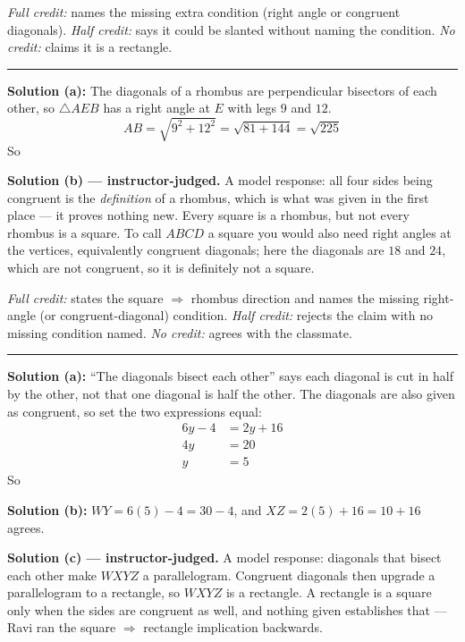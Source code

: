 \documentclass[12pt]{article}
\begin{document}
\emph{Full credit:} names the missing extra condition (right angle or congruent diagonals). \emph{Half credit:} says it could be slanted without naming the condition. \emph{No credit:} claims it is a rectangle.

\vspace{0.2cm}\noindent\rule{\linewidth}{0.2pt}


\textbf{Solution (a):} The diagonals of a rhombus are perpendicular bisectors of each other, so $\triangle AEB$ has a right angle at $E$ with legs $9$ and $12$.
\[ AB = \sqrt{9^2 + 12^2} = \sqrt{81 + 144} = \sqrt{225} \]
So 

\textbf{Solution (b) --- instructor-judged.} A model response: all four sides being congruent is the \emph{definition} of a rhombus, which is what was given in the first place --- it proves nothing new. Every square is a rhombus, but not every rhombus is a square. To call $ABCD$ a square you would also need right angles at the vertices, equivalently congruent diagonals; here the diagonals are $18$ and $24$, which are not congruent, so it is definitely not a square.

\emph{Full credit:} states the square $\Rightarrow$ rhombus direction and names the missing right-angle (or congruent-diagonal) condition. \emph{Half credit:} rejects the claim with no missing condition named. \emph{No credit:} agrees with the classmate.

\vspace{0.2cm}\noindent\rule{\linewidth}{0.2pt}


\textbf{Solution (a):} ``The diagonals bisect each other'' says each diagonal is cut in half by the other, not that one diagonal is half the other. The diagonals are also given as congruent, so set the two expressions equal:
\begin{align*}
  6y - 4 &= 2y + 16 \\
  4y &= 20 \\
  y &= 5
\end{align*}
So 

\textbf{Solution (b):} $WY = 6(5) - 4 = 30 - 4$, and $XZ = 2(5) + 16 = 10 + 16$ agrees. 

\textbf{Solution (c) --- instructor-judged.} A model response: diagonals that bisect each other make $WXYZ$ a parallelogram. Congruent diagonals then upgrade a parallelogram to a rectangle, so $WXYZ$ is a rectangle. A rectangle is a square only when the sides are congruent as well, and nothing given establishes that --- Ravi ran the square $\Rightarrow$ rectangle implication backwards.
\end{document}
